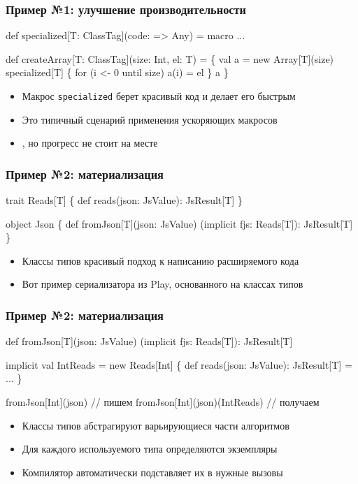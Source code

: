 \documentclass[svgnames,hyperref={bookmarks=false},11pt]{beamer}
\begin{document}
\begin{frame}[fragile]
\frametitle{Пример №1: улучшение производительности}

\begin{semiverbatim}
\alert{def specialized[T: ClassTag](code: => Any) = macro ...}

def createArray[T: ClassTag](size: Int, el: T) = \{
  val a = new Array[T](size)
  \alert{specialized[T] \{}
    for (i <- 0 until size) a(i) = el
  \alert{\}}
  a
\}
\end{semiverbatim}

\begin{itemize}
\item Макрос \texttt{specialized} берет красивый код и делает его быстрым
\item Это типичный сценарий применения ускоряющих макросов
\item {}, но прогресс не стоит на месте
\end{itemize}
\end{frame}

\begin{frame}[fragile]
\frametitle{Пример №2: материализация}

\begin{semiverbatim}
trait Reads[T] \{
  def reads(json: JsValue): JsResult[T]
\}

object Json \{
  def fromJson[T](json: JsValue)
    (implicit fjs: Reads[T]): JsResult[T]
\}

\end{semiverbatim}

\begin{itemize}
\item Классы типов \text{\textendash} красивый подход к написанию расширяемого кода
\item Вот пример сериализатора из Play, основанного на классах типов
\end{itemize}
\end{frame}

\begin{frame}[fragile]
\frametitle{Пример №2: материализация}

\begin{semiverbatim}
def fromJson[T](json: JsValue)
  (implicit fjs: Reads[T]): JsResult[T]

implicit val IntReads = new Reads[Int] \{
  def reads(json: JsValue): JsResult[T] = ...
\}

fromJson[Int](json) // пишем
fromJson[Int](json)(IntReads) // получаем

\end{semiverbatim}

\begin{itemize}
\item Классы типов абстрагируют варьирующиеся части алгоритмов
\item Для каждого используемого типа определяются экземпляры
\item Компилятор автоматически подставляет их в нужные вызовы
\end{itemize}
\end{frame}
\end{document}
